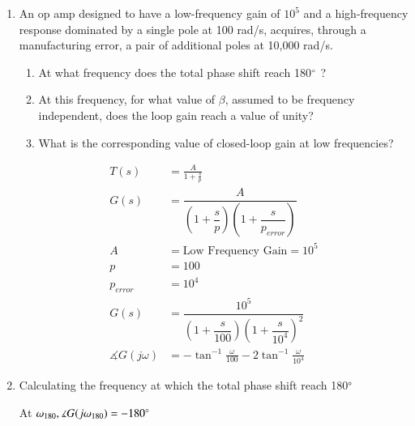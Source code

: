 \begin{enumerate}[label=\thesection.\arabic*.,ref=\thesection.\theenumi]
\item An op amp designed to have a low-frequency gain of $10^{5}$ and a high-frequency response dominated by a single pole at 100 rad/s, acquires, through a manufacturing error, a pair of additional poles at 10,000 rad/s. 
\begin{enumerate}
\item At what frequency does the total phase shift reach 180$\degree$ ? 
\item At this frequency, for what value of $\beta$, assumed to be frequency independent, does the loop gain reach a value of unity? 
\item What is the corresponding value of closed-loop gain at low frequencies?
\end{enumerate}
\solution
\begin{align}
T(s) &= \frac{A}{1+\frac{s}{p}} 
\\
G(s) &= \dfrac{A}{(1+\dfrac{s}{p})(1+\dfrac{s}{p_{error}})} 
\\
A &= \text{Low Frequency Gain} = 10^{5}
\\
p &= 100
\\
p_{error} &= 10^{4}
\\
G(s) &= \dfrac{10^{5}}{(1+\dfrac{s}{100})(1+\dfrac{s}{10^{4}})^{2}}
\\
\measuredangle G(j\omega) &= -\tan^{-1}\frac{\omega}{100} - 2\tan^{-1}\frac{\omega}{10^{4}}
\end{align}
\item Calculating the frequency at which the total phase shift reach 180$\degree$ 

At $\omega_{180}, \measuredangle G(j\omega_{180}) = -180\degree$


\end{enumerate}
